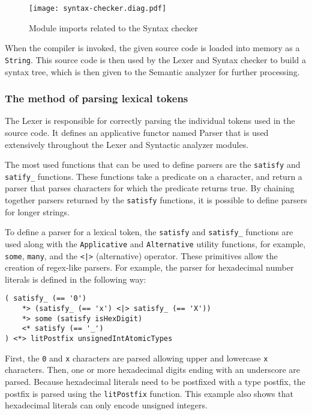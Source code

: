 \documentclass[12pt]{article}
\begin{document}
\begin{figure}[t]
\texttt{[image: syntax-checker.diag.pdf]}
\centering
\caption{Module imports related to the Syntax checker}
\end{figure}

When the compiler is invoked, the given source code is loaded into memory as a
\verb$String$. This source code is then used by the Lexer and
Syntax checker to build a syntax tree, which is then given to the
Semantic analyzer for further processing.

\subsubsection{The method of parsing lexical tokens}

The Lexer is responsible for correctly parsing the individual tokens used in the
source code. It defines an applicative functor named Parser that is used
extensively throughout the Lexer and Syntactic analyzer modules. 

The most used functions that can be used to define parsers are the
\verb$satisfy$ and \verb$satify_$ functions. These functions take a predicate on
a character, and return a parser that parses characters for which the predicate
returns true. By chaining together parsers returned by the \verb$satisfy$
functions, it is possible to define parsers for longer strings.

To define a parser for a lexical token, the \verb$satisfy$ and \verb$satisfy_$
functions are used along with the \verb$Applicative$ and \verb$Alternative$
utility functions, for example, \verb$some$, \verb$many$, and the \verb$<|>$
(alternative) operator. These primitives allow the creation of regex-like
parsers. For example, the parser for hexadecimal number literals is defined in
the following way:
\\\noindent\begin{minipage}{\textwidth}
\begin{lstlisting}
( satisfy_ (== '0')
    *> (satisfy_ (== 'x') <|> satisfy_ (== 'X'))
    *> some (satisfy isHexDigit)
    <* satisfy (== '_')
) <*> litPostfix unsignedIntAtomicTypes
\end{lstlisting}
\end{minipage}
First, the \verb$0$ and \verb$x$ characters are parsed allowing upper and
lowercase \verb$x$ characters. Then, one or more hexadecimal digits ending with
an underscore are parsed. Because hexadecimal literals need to be postfixed with
a type postfix, the postfix is parsed using the \verb$litPostfix$ function. This
example also shows that hexadecimal literals can only encode unsigned integers.
\end{document}
